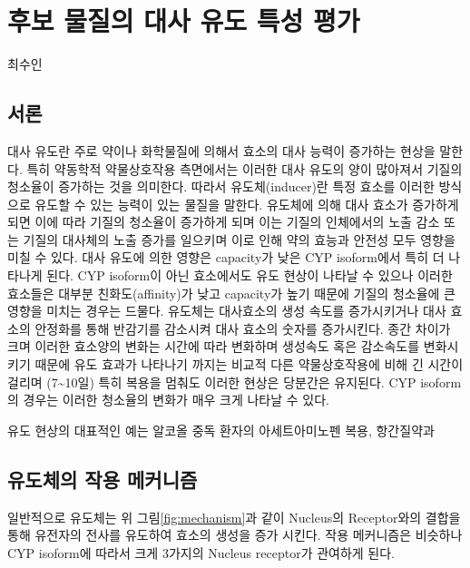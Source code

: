 \documentclass[
  11pt,
  krantz2, a4paper, twoside]{krantz}
\begin{document}
\hypertarget{Induction}{%
\chapter{후보 물질의 대사 유도 특성 평가}\label{Induction}}

\Large\hfill

최수인
\normalsize

\hypertarget{uxc11cuxb860-5}{%
\section{서론}\label{uxc11cuxb860-5}}

대사 유도란 주로 약이나 화학물질에 의해서 효소의 대사 능력이 증가하는 현상을 말한다. 특히 약동학적 약물상호작용 측면에서는 이러한 대사 유도의 양이 많아져서 기질의 청소율이 증가하는 것을 의미한다.
따라서 유도체(inducer)란 특정 효소를 이러한 방식으로 유도할 수 있는 능력이 있는 물질을 말한다.
유도체에 의해 대사 효소가 증가하게 되면 이에 따라 기질의 청소율이 증가하게 되며 이는 기질의 인체에서의 노출 감소 또는 기질의 대사체의 노출 증가를 일으키며 이로 인해 약의 효능과 안전성 모두 영향을 미칠 수 있다.
대사 유도에 의한 영향은 capacity가 낮은 CYP isoform에서 특히 더 나타나게 된다. CYP isoform이 아닌 효소에서도 유도 현상이 나타날 수 있으나 이러한 효소들은 대부분 친화도(affinity)가 낮고 capacity가 높기 때문에 기질의 청소율에 큰 영향을 미치는 경우는 드물다.
유도체는 대사효소의 생성 속도를 증가시키거나 대사 효소의 안정화를 통해 반감기를 감소시켜 대사 효소의 숫자를 증가시킨다.
종간 차이가 크며 이러한 효소양의 변화는 시간에 따라 변화하며 생성속도 혹은 감소속도를 변화시키기 때문에 유도 효과가 나타나기 까지는 비교적 다른 약물상호작용에 비해 긴 시간이 걸리며 (7\textasciitilde10일) 특히 복용을 멈춰도 이러한 현상은 당분간은 유지된다. CYP isoform의 경우는 이러한 청소율의 변화가 매우 크게 나타날 수 있다.

유도 현상의 대표적인 예는 알코올 중독 환자의 아세트아미노펜 복용, 항간질약과

\hypertarget{uxc720uxb3c4uxccb4uxc758-uxc791uxc6a9-uxba54uxcee4uxb2c8uxc998}{%
\section{유도체의 작용 메커니즘}\label{uxc720uxb3c4uxccb4uxc758-uxc791uxc6a9-uxba54uxcee4uxb2c8uxc998}}

일반적으로 유도체는 위 그림\ref{fig:mechanism}과 같이 Nucleus의 Receptor와의 결합을 통해 유전자의 전사를 유도하여 효소의 생성을 증가 시킨다.
작용 메커니즘은 비슷하나 CYP isoform에 따라서 크게 3가지의 Nucleus receptor가 관여하게 된다.
\end{document}
